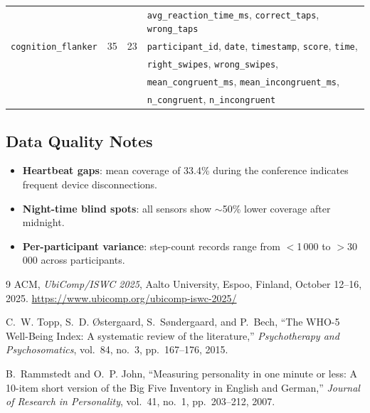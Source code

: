 \documentclass[11pt,a4paper]{article}
\begin{document}
\begin{table}[H]
\begin{tabular}{lrrl}
    & & & \texttt{avg\_reaction\_time\_ms}, \texttt{correct\_taps}, \texttt{wrong\_taps} \\
\texttt{cognition\_flanker}
    & 35 & 23
    & \texttt{participant\_id}, \texttt{date}, \texttt{timestamp}, \texttt{score}, \texttt{time}, \\
    & & & \texttt{right\_swipes}, \texttt{wrong\_swipes}, \\
    & & & \texttt{mean\_congruent\_ms}, \texttt{mean\_incongruent\_ms}, \\
    & & & \texttt{n\_congruent}, \texttt{n\_incongruent} \\
\bottomrule
\end{tabular}
\end{table}

\subsection{Data Quality Notes}

\begin{itemize}
    \item \textbf{Heartbeat gaps}: mean coverage of 33.4\% during the conference indicates frequent device disconnections.
    \item \textbf{Night-time blind spots}: all sensors show $\sim$50\% lower coverage after midnight.
    \item \textbf{Per-participant variance}: step-count records range from $<$1\,000 to $>$30\,000 across participants.
\end{itemize}

\begin{thebibliography}{9}
ACM, \emph{UbiComp/ISWC 2025}, Aalto University, Espoo, Finland, October 12--16, 2025.
\url{https://www.ubicomp.org/ubicomp-iswc-2025/}

C.~W. Topp, S.~D. {\O}stergaard, S.~S{\o}ndergaard, and P.~Bech,
``The WHO-5 Well-Being Index: A systematic review of the literature,''
\emph{Psychotherapy and Psychosomatics}, vol.~84, no.~3, pp.~167--176, 2015.

B.~Rammstedt and O.~P. John,
``Measuring personality in one minute or less: A 10-item short version of the Big Five Inventory in English and German,''
\emph{Journal of Research in Personality}, vol.~41, no.~1, pp.~203--212, 2007.
\end{thebibliography}
\end{document}
